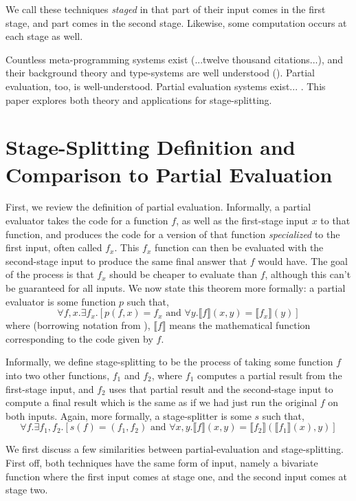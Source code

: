 \documentclass{sigplanconf}
\begin{document}
We call these techniques {\em staged} in that part of their input comes in the first stage, and part comes in the second stage.  Likewise, some computation occurs at each stage as well.

Countless meta-programming systems exist (...twelve thousand citations...\cite{devito13}), and their background theory and type-systems are well understood (\cite{davies01}).  Partial evaluation, too, is well-understood.  Partial evaluation systems exist... . This paper explores both theory and applications for stage-splitting.  

\section{Stage-Splitting Definition and Comparison to Partial Evaluation}

First, we review the definition of partial evaluation.  Informally, a partial evaluator takes the code for a function $f$, as well as the first-stage input $x$ to that function, and produces the code for a version of that function {\em specialized} to the first input, often called $f_x$.  This $f_x$ function can then be evaluated with the second-stage input to produce the same final answer that $f$ would have.  The goal of the process is that $f_x$ should be cheaper to evaluate than $f$, although this can't be guaranteed for all inputs.  We now state this theorem more formally: a partial evaluator is some function $p$ such that,
\[
	\forall f,x. \exists f_x. [p(f,x) = f_x \text{ and } \forall y.\llbracket f \rrbracket(x,y)=\llbracket f_x \rrbracket(y)]
\]
where (borrowing notation from \cite{jones96}), $\llbracket f \rrbracket$ means the mathematical function corresponding to the code given by $f$.

Informally, we define stage-splitting to be the process of taking some function $f$ into two other functions, $f_1$ and $f_2$, where $f_1$ computes a partial result from the first-stage input, and $f_2$ uses that partial result and the second-stage input to compute a final result which is the same as if we had just run the original $f$ on both inputs.  Again, more formally, a stage-splitter is some $s$ such that,
\[
	\forall f. \exists f_1,f_2. [s(f) = (f_1,f_2) \text{ and } 
	\forall x,y.\llbracket f \rrbracket(x,y)=\llbracket f_2 \rrbracket(\llbracket f_1 \rrbracket(x),y)]
\]

We first discuss a few similarities between partial-evaluation and stage-splitting.  First off, both techniques have the same form of input, namely a bivariate function where the first input comes at stage one, and the second input comes at stage two.  
\end{document}
